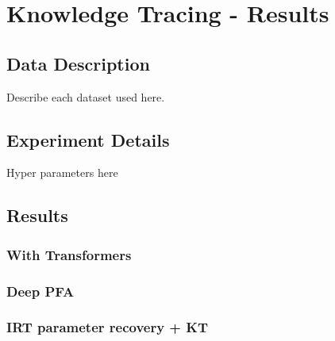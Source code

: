 \chapter{Knowledge Tracing - Results}

\section{Data Description}
Describe each dataset used here.

\section{Experiment Details}
Hyper parameters here

\section{Results}

\subsection{With Transformers}

\subsection{Deep PFA}

\subsection{IRT parameter recovery + KT}


